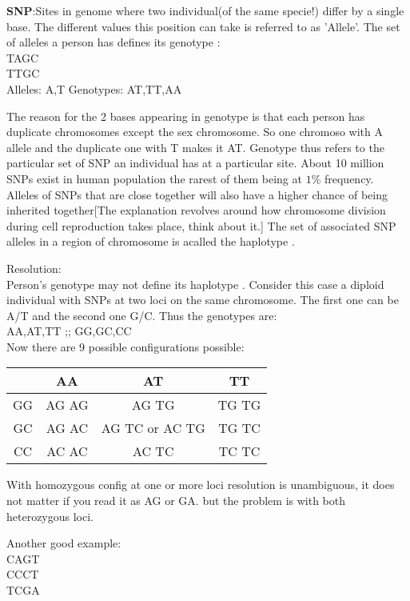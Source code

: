 \documentclass[a4paper]{article}
\begin{document}
\textbf{SNP}:Sites in genome where two individual(of the same specie!)  differ by a single base. The different values this position can take is referred to as 'Allele'. The set of alleles 
a person has defines its genotype : \\
T{\color{red}A}GC \\
T{\color{red}T}GC \\

Alleles: A,T
Genotypes: AT,TT,AA

The reason for the 2 bases appearing in genotype is that each person has duplicate chromosomes except the sex chromosome. So one chromoso with A allele and the duplicate one with T makes 
it AT. Genotype thus refers to the particular set of SNP an individual has at a particular site.  About 10 million SNPs exist in human population the rarest of them being at $1\% $ frequency. Alleles
of SNPs that are close together will also have a higher chance of being inherited together[The explanation revolves around how chromosome division during cell reproduction takes place, think about it.]
The set of associated SNP alleles in  a region of chromosome is acalled the haplotype . 

Resolution:\\
Person's genotype may not define its  haplotype . Consider this case a diploid individual with SNPs at two loci on the same chromosome. The  first one can be A/T and the second one
G/C. Thus the genotypes are: \\
AA,AT,TT ;; GG,GC,CC \\

Now there are 9 possible configurations possible:\\
\begin{tabular}{c|c|c|c}
 \hline
	   &  AA   &       AT       &  TT   \\
	   \hline
	GG & AG AG &     AG TG      & TG TG \\
	 \hline
	GC & AG AC & AG TC or	AC TG & TG TC \\
	 \hline
	CC & AC AC &     AC TC      & TC TC \\
	 \hline
\end{tabular}

With homozygous config at one or more loci resolution is unambiguous, it does not matter if you read it as AG or GA. but the problem is with both heterozygous loci.

Another good example: \\

{\color{red}{A}}CA{\color{green}{T}}GT \\
{\color{red}{A}}CC{\color{green}{G}}CT \\
{\color{red}{G}}TC{\color{green}{G}}GA \\
\end{document}
